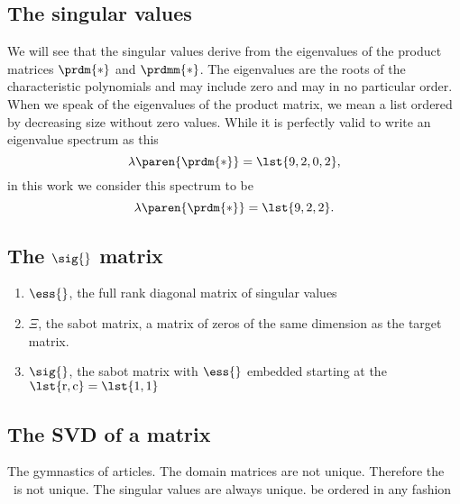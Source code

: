 \subsection{The singular values}
We will see that the singular values derive from the eigenvalues of the product matrices $\prdm{*}$ and $\prdmm{*}$. The eigenvalues are the roots of the characteristic polynomials and may include zero and may 
in no particular order. When we speak of the eigenvalues of the product matrix, we mean a list ordered by decreasing size without zero values. While it is perfectly valid to write an eigenvalue spectrum as this
\begin{equation}
  \lambda\paren{\prdm{*}} = \lst{9,2,0,2},
\end{equation}
in this work we consider this spectrum to be
\begin{equation}
  \lambda\paren{\prdm{*}} = \lst{9,2,2}.
\end{equation}

\subsection{The $\sig{}$ matrix}
\begin{enumerate}
\item $\ess{}$, the full rank diagonal matrix of singular values
\item $\Xi$, the sabot matrix, a matrix of zeros of the same dimension as the target matrix.
\item $\sig{}$, the sabot matrix with $\ess{}$ embedded starting at the $\lst{\text{r},\text{c}}=\lst{1,1}$
\end{enumerate}

\subsection{The SVD of a matrix}
The gymnastics of articles. The domain matrices are not unique. Therefore the \svdl\ is not unique. The singular values are always unique.
be ordered in any fashion

\endinput
